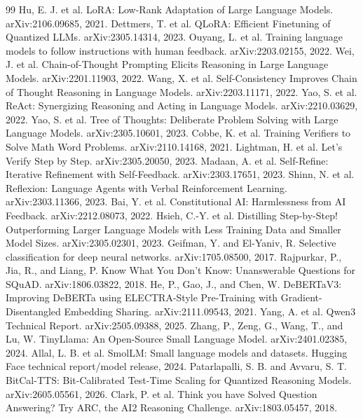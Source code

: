 \documentclass[11pt]{article}
\begin{document}
{\small
\begin{thebibliography}{99}
 Hu, E. J. et al. LoRA: Low-Rank Adaptation of Large Language Models. arXiv:2106.09685, 2021.
 Dettmers, T. et al. QLoRA: Efficient Finetuning of Quantized LLMs. arXiv:2305.14314, 2023.
 Ouyang, L. et al. Training language models to follow instructions with human feedback. arXiv:2203.02155, 2022.
 Wei, J. et al. Chain-of-Thought Prompting Elicits Reasoning in Large Language Models. arXiv:2201.11903, 2022.
 Wang, X. et al. Self-Consistency Improves Chain of Thought Reasoning in Language Models. arXiv:2203.11171, 2022.
 Yao, S. et al. ReAct: Synergizing Reasoning and Acting in Language Models. arXiv:2210.03629, 2022.
 Yao, S. et al. Tree of Thoughts: Deliberate Problem Solving with Large Language Models. arXiv:2305.10601, 2023.
 Cobbe, K. et al. Training Verifiers to Solve Math Word Problems. arXiv:2110.14168, 2021.
 Lightman, H. et al. Let's Verify Step by Step. arXiv:2305.20050, 2023.
 Madaan, A. et al. Self-Refine: Iterative Refinement with Self-Feedback. arXiv:2303.17651, 2023.
 Shinn, N. et al. Reflexion: Language Agents with Verbal Reinforcement Learning. arXiv:2303.11366, 2023.
 Bai, Y. et al. Constitutional AI: Harmlessness from AI Feedback. arXiv:2212.08073, 2022.
 Hsieh, C.-Y. et al. Distilling Step-by-Step! Outperforming Larger Language Models with Less Training Data and Smaller Model Sizes. arXiv:2305.02301, 2023.
 Geifman, Y. and El-Yaniv, R. Selective classification for deep neural networks. arXiv:1705.08500, 2017.
 Rajpurkar, P., Jia, R., and Liang, P. Know What You Don't Know: Unanswerable Questions for SQuAD. arXiv:1806.03822, 2018.
 He, P., Gao, J., and Chen, W. DeBERTaV3: Improving DeBERTa using ELECTRA-Style Pre-Training with Gradient-Disentangled Embedding Sharing. arXiv:2111.09543, 2021.
 Yang, A. et al. Qwen3 Technical Report. arXiv:2505.09388, 2025.
 Zhang, P., Zeng, G., Wang, T., and Lu, W. TinyLlama: An Open-Source Small Language Model. arXiv:2401.02385, 2024.
 Allal, L. B. et al. SmolLM: Small language models and datasets. Hugging Face technical report/model release, 2024.
 Patarlapalli, S. B. and Avvaru, S. T. BitCal-TTS: Bit-Calibrated Test-Time Scaling for Quantized Reasoning Models. arXiv:2605.05561, 2026.
 Clark, P. et al. Think you have Solved Question Answering? Try ARC, the AI2 Reasoning Challenge. arXiv:1803.05457, 2018.
\end{thebibliography}
}
\end{document}
